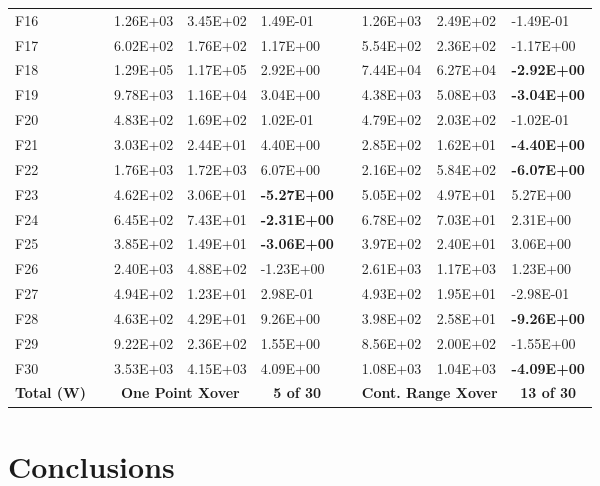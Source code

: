 \documentclass[graybox]{svmult}
\begin{document}
\begin{table}[]
\begin{tabular}{@{}lllllllll@{}}
    F16 &  & 1.26E+03 & 3.45E+02 & 1.49E-01 &  & 1.26E+03 & 2.49E+02 & -1.49E-01 \\
    F17 &  & 6.02E+02 & 1.76E+02 & 1.17E+00 &  & 5.54E+02 & 2.36E+02 & -1.17E+00 \\
    F18 &  & 1.29E+05 & 1.17E+05 & 2.92E+00 &  & 7.44E+04 & 6.27E+04 & \textbf{-2.92E+00} \\
    F19 &  & 9.78E+03 & 1.16E+04 & 3.04E+00 &  & 4.38E+03 & 5.08E+03 & \textbf{-3.04E+00} \\
    F20 &  & 4.83E+02 & 1.69E+02 & 1.02E-01 &  & 4.79E+02 & 2.03E+02 & -1.02E-01 \\
    F21 &  & 3.03E+02 & 2.44E+01 & 4.40E+00 &  & 2.85E+02 & 1.62E+01 & \textbf{-4.40E+00} \\
    F22 &  & 1.76E+03 & 1.72E+03 & 6.07E+00 &  & 2.16E+02 & 5.84E+02 & \textbf{-6.07E+00} \\
    F23 &  & 4.62E+02 & 3.06E+01 & \textbf{-5.27E+00} &  & 5.05E+02 & 4.97E+01 & 5.27E+00 \\
    F24 &  & 6.45E+02 & 7.43E+01 & \textbf{-2.31E+00} &  & 6.78E+02 & 7.03E+01 & 2.31E+00 \\
    F25 &  & 3.85E+02 & 1.49E+01 & \textbf{-3.06E+00} &  & 3.97E+02 & 2.40E+01 & 3.06E+00 \\
    F26 &  & 2.40E+03 & 4.88E+02 & -1.23E+00 &  & 2.61E+03 & 1.17E+03 & 1.23E+00 \\
    F27 &  & 4.94E+02 & 1.23E+01 & 2.98E-01 &  & 4.93E+02 & 1.95E+01 & -2.98E-01 \\
    F28 &  & 4.63E+02 & 4.29E+01 & 9.26E+00 &  & 3.98E+02 & 2.58E+01 & \textbf{-9.26E+00} \\
    F29 &  & 9.22E+02 & 2.36E+02 & 1.55E+00 &  & 8.56E+02 & 2.00E+02 & -1.55E+00 \\
    F30 &  & 3.53E+03 & 4.15E+03 & 4.09E+00 &  & 1.08E+03 & 1.04E+03 & \textbf{-4.09E+00} \\
    \multicolumn{1}{c}{\textbf{Total (W)}} & \multicolumn{1}{c}{\textbf{}} & \multicolumn{2}{c}{\textbf{One Point Xover}} & \multicolumn{1}{c}{\textbf{5 of 30}} & \multicolumn{1}{c}{\textbf{}} & \multicolumn{2}{c}{\textbf{Cont. Range Xover}} & \multicolumn{1}{c}{\textbf{13 of 30}} \\ \bottomrule
    \end{tabular}
    \end{table}

    \FloatBarrier

\section{Conclusions}
    \label{section.conclusions}
\end{document}
